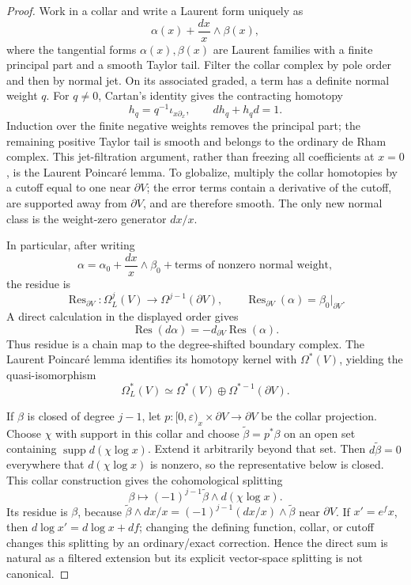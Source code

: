 \documentclass[11pt,oneside,reqno]{article}
\theoremstyle{plain}
\theoremstyle{definition}
\theoremstyle{remark}
\begin{document}
\begin{proof}
Work in a collar and write a Laurent form uniquely as
\[
 \alpha(x)+\frac{dx}{x}\wedge\beta(x),
\]
where the tangential forms \(\alpha(x),\beta(x)\) are Laurent families with
a finite principal part and a smooth Taylor tail. Filter the collar complex by
pole order and then by normal jet. On its associated graded, a term has a
definite normal weight \(q\). For \(q\ne0\), Cartan's identity gives the
contracting homotopy
\[
 h_q=q^{-1}\iota_{x\partial_x},
 \qquad dh_q+h_qd=1.
\]
Induction over the finite negative weights removes the principal part;
the remaining positive Taylor tail is smooth and belongs to the ordinary
de Rham complex. This jet-filtration argument, rather than freezing all
coefficients at \(x=0\), is the Laurent Poincar\'e lemma. To globalize,
multiply the collar homotopies by a cutoff equal to one near \(\partial V\);
the error terms contain a derivative of the cutoff, are supported away from
\(\partial V\), and are therefore smooth. The only new normal class is the
weight-zero generator \(dx/x\).

In particular, after writing
\[
 \alpha=\alpha_0+\frac{dx}{x}\wedge\beta_0
          +\text{terms of nonzero normal weight},
\]
the residue is
\[
 \operatorname{Res}_{\partial V}:\Omega_L^j(V)\longrightarrow
 \Omega^{j-1}(\partial V),
 \qquad
 \operatorname{Res}_{\partial V}(\alpha)=\beta_0|_{\partial V}.
\]
A direct calculation in the displayed order gives
\[
 \operatorname{Res}(d\alpha)=-d_{\partial V}\operatorname{Res}(\alpha).
\]
Thus residue is a chain map to the degree-shifted boundary complex. The
Laurent Poincar\'e lemma identifies its homotopy kernel with
\(\Omega^*(V)\), yielding the quasi-isomorphism
\[
 \Omega_L^*(V)\simeq
 \Omega^*(V)\oplus\Omega^{*-1}(\partial V).
\]

If \(\beta\) is closed of degree \(j-1\), let
\(p:[0,\varepsilon)_x\times\partial V\to\partial V\) be the collar
projection. Choose \(\chi\) with support in this collar and choose
\(\widetilde\beta=p^*\beta\) on an open set containing
\(\operatorname{supp}d(\chi\log x)\). Extend it arbitrarily beyond that
set. Then \(d\widetilde\beta=0\) everywhere that
\(d(\chi\log x)\) is nonzero, so the representative below is closed. This
collar construction gives the
cohomological splitting
\[
 \beta\longmapsto
 (-1)^{j-1}\widetilde\beta\wedge d(\chi\log x).
\]
Its residue is \(\beta\), because
\(\widetilde\beta\wedge dx/x=(-1)^{j-1}(dx/x)\wedge\widetilde\beta\) near
\(\partial V\). If \(x'=e^fx\), then
\(d\log x'=d\log x+df\); changing the defining function, collar, or cutoff
changes this splitting by an ordinary/exact correction. Hence the direct
sum is natural as a filtered extension but its explicit vector-space
splitting is not canonical.
\end{proof}
\end{document}
